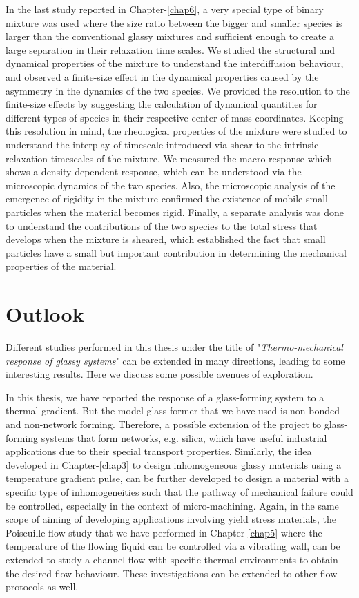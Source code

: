 In the last study reported in Chapter-\ref{chap6}, a very special type of binary mixture was used where the size ratio between the bigger and smaller species is larger than the conventional glassy mixtures and sufficient enough to create a large separation in their relaxation time scales. We studied the structural and dynamical properties of the mixture to understand the interdiffusion behaviour, and observed a finite-size effect in the dynamical properties caused by the asymmetry in the dynamics of the two species. We provided the resolution to the finite-size effects by suggesting the calculation of dynamical quantities for different types of species in their respective center of mass coordinates. Keeping this resolution in mind, the rheological properties of the mixture were studied to understand the interplay of timescale introduced via shear to the intrinsic relaxation timescales of the mixture. We measured the macro-response which shows a density-dependent response, which can be understood via the microscopic dynamics of the two species. Also, the microscopic analysis of the emergence of rigidity in the mixture confirmed the existence of mobile small particles when the material becomes rigid. Finally, a separate analysis was done to understand the contributions of the two species to the total stress that develops when the mixture is sheared, which established the fact that small particles have a small but important contribution in determining the mechanical properties of the material.


\section{Outlook}
Different studies performed in this thesis under the title of "{\em Thermo-mechanical response of glassy systems}" can be extended in many directions, leading to some interesting results. Here we discuss some possible avenues of exploration.

In this thesis, we have reported the response of a glass-forming system to a thermal gradient. But the model glass-former that we have used is non-bonded and non-network forming. Therefore, a possible extension of the project to glass-forming systems that form networks, e.g. silica, which have useful industrial applications due to their special transport properties. Similarly, the idea developed in Chapter-\ref{chap3} to design inhomogeneous glassy materials using a temperature gradient pulse, can be further developed to design a material with a specific type of inhomogeneities such that the pathway of mechanical failure could be controlled, especially in the context of micro-machining.  Again, in the same scope of aiming of developing applications involving yield stress materials, the Poiseuille flow study that we have performed in Chapter-\ref{chap5} where the temperature of the flowing liquid can be controlled via a vibrating wall, can be extended to study a channel flow with specific thermal environments to obtain the desired flow behaviour. These investigations can be extended to other flow protocols as well.

